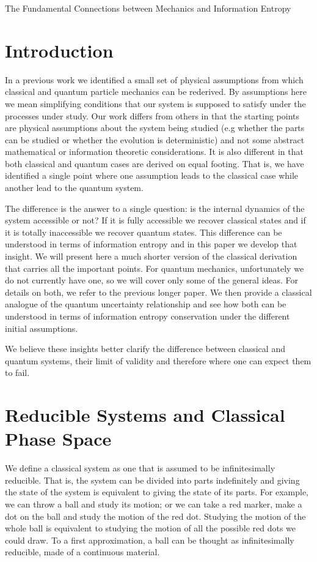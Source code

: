 \documentclass{ws-ijqi}
\begin{document}
{The Fundamental Connections between Mechanics and Information Entropy}

\section{Introduction}
In a previous work\cite{Carc1} we identified a small set of physical assumptions from which classical and quantum particle mechanics can be rederived. By assumptions here we mean simplifying conditions that our system is supposed to satisfy under the processes under study. Our work differs from others\cite{PhysRevA.84.012311} in that the starting points are physical assumptions about the system being studied (e.g whether the parts can be studied or whether the evolution is deterministic) and not some abstract mathematical or information theoretic considerations. It is also different in that both classical and quantum cases are derived on equal footing. That is, we have identified a single point where one assumption leads to the classical case while another lead to the quantum system.

The difference is the answer to a single question: is the internal dynamics of the system accessible or not? If it is fully accessible we recover classical states and if it is totally inaccessible we recover quantum states. This difference can be understood in terms of information entropy and in this paper we develop that insight. We will present here a much shorter version of the classical derivation that carries all the important points. For quantum mechanics, unfortunately we do not currently have one, so we will cover only some of the general ideas. For details on both, we refer to the previous longer paper. We then provide a classical analogue of the quantum uncertainty relationship and see how both can be understood in terms of information entropy conservation under the different initial assumptions.

We believe these insights better clarify the difference between classical and quantum systems, their limit of validity and therefore where one can expect them to fail.

\section{Reducible Systems and Classical Phase Space}
We define a classical system as one that is assumed to be infinitesimally reducible. That is, the system can be divided into parts indefinitely and giving the state of the system is equivalent to giving the state of its parts. For example, we can throw a ball and study its motion; or we can take a red marker, make a dot on the ball and study the motion of the red dot. Studying the motion of the whole ball is equivalent to studying the motion of all the possible red dots we could draw. To a first approximation, a ball can be thought as infinitesimally reducible, made of a continuous material.
\end{document}
